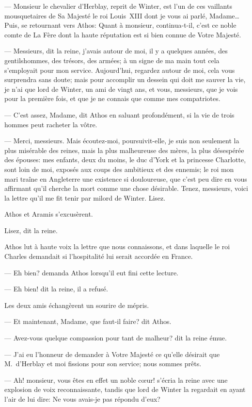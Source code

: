 — Monsieur le chevalier d'Herblay, reprit de Winter, est l'un de ces vaillants mousquetaires de Sa Majesté le roi Louis~XIII dont je vous ai parlé, Madame\dots Puis, se retournant vers Athos: Quant à monsieur, continua-t-il, c'est ce noble comte de La Fère dont la haute réputation est si bien connue de Votre Majesté.

— Messieurs, dit la reine, j'avais autour de moi, il y a quelques années, des gentilshommes, des trésors, des armées; à un signe de ma main tout cela s'employait pour mon service. Aujourd'hui, regardez autour de moi, cela vous surprendra sans doute; mais pour accomplir un dessein qui doit me sauver la vie, je n'ai que lord de Winter, un ami de vingt ans, et vous, messieurs, que je vois pour la première fois, et que je ne connais que comme mes compatriotes.

— C'est assez, Madame, dit Athos en saluant profondément, si la vie de trois hommes peut racheter la vôtre.

— Merci, messieurs. Mais écoutez-moi, poursuivit-elle, je suis non seulement la plus misérable des reines, mais la plus malheureuse des mères, la plus désespérée des épouses: mes enfants, deux du moins, le duc d'York et la princesse Charlotte, sont loin de moi, exposés aux coups des ambitieux et des ennemis; le roi mon mari traîne en Angleterre une existence si douloureuse, que c'est peu dire en vous affirmant qu'il cherche la mort comme une chose désirable. Tenez, messieurs, voici la lettre qu'il me fit tenir par milord de Winter. Lisez.

Athos et Aramis s'excusèrent.

Lisez, dit la reine.

Athos lut à haute voix la lettre que nous connaissons, et dans laquelle le roi Charles demandait si l'hospitalité lui serait accordée en France.

— Eh bien? demanda Athos lorsqu'il eut fini cette lecture.

— Eh bien! dit la reine, il a refusé.

Les deux amis échangèrent un sourire de mépris.

— Et maintenant, Madame, que faut-il faire? dit Athos.

— Avez-vous quelque compassion pour tant de malheur? dit la reine émue.

— J'ai eu l'honneur de demander à Votre Majesté ce qu'elle désirait que M.~d'Herblay et moi fissions pour son service; nous sommes prêts.

— Ah! monsieur, vous êtes en effet un noble cœur! s'écria la reine avec une explosion de voix reconnaissante, tandis que lord de Winter la regardait en ayant l'air de lui dire: Ne vous avais-je pas répondu d'eux?

